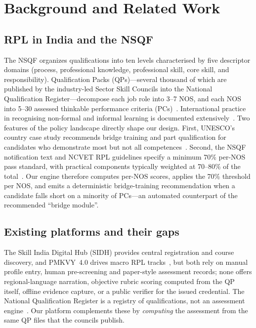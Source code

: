 \documentclass[conference]{IEEEtran}
\begin{document}
\section{Background and Related Work}
\subsection{RPL in India and the NSQF}
The NSQF organizes qualifications into ten levels characterised by five descriptor domains
(process, professional knowledge, professional skill, core skill, and responsibility).
Qualification Packs (QPs)---several thousand of which are published by the industry-led
Sector Skill Councils into the National Qualification Register---decompose each job role
into 3--7 NOS, and each NOS into 5--30 assessed thinkable performance criteria
(PCs)~\cite{nqr,nsdc_qp}. International practice in recognising non-formal and informal
learning is documented extensively~\cite{singh_rpl,werquin_rpl}. Two features of the policy
landscape directly shape our design. First, UNESCO's country case study recommends bridge training and part qualification for
candidates who demonstrate most but not all competences~\cite{unesco_uil}. Second, the NSQF
notification text and NCVET RPL guidelines specify a minimum 70\% per-NOS pass standard,
with practical components typically weighted at 70--80\% of the total~\cite{ncvet_rpl}.
Our engine therefore computes per-NOS scores, applies the 70\% threshold per NOS, and emits
a deterministic bridge-training recommendation when a candidate falls short on a minority
of PCs---an automated counterpart of the recommended ``bridge module''.

\subsection{Existing platforms and their gaps}
The Skill India Digital Hub (SIDH) provides central registration and course discovery, and
PMKVY~4.0 drives macro RPL tracks~\cite{sidh,pib_2025}, but both rely on manual profile
entry, human pre-screening and paper-style assessment records; none offers regional-language
narration, objective rubric scoring computed from the QP itself, offline evidence capture,
or a public verifier for the issued credential. The National Qualification Register is a
registry of qualifications, not an assessment engine~\cite{nqr}. Our platform complements
these by \emph{computing} the assessment from the same QP files that the councils publish.
\end{document}
